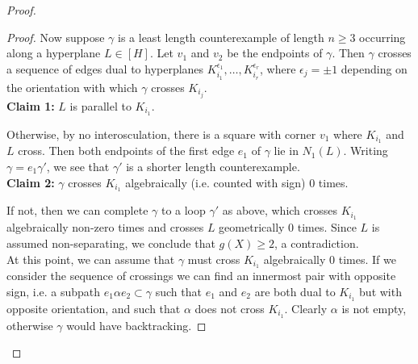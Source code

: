 \documentclass[11pt]{amsart}
\numberwithin{thm}{section}
\theoremstyle{remark}
\theoremstyle{definition}
\newcommand{\overl}[1]{\overline{#1}}
\begin{document}
\begin{proof}
\begin{proof}

Now suppose $\gamma$ is a least length counterexample of length $n\geq 3$ occurring along a hyperplane $L\in [H]$.  Let $v_1$ and $v_2$ be the endpoints of $\gamma$.  Then $\gamma$ crosses a sequence of edges dual to hyperplanes $K_{i_1}^{\epsilon_1},\ldots, K_{i_r}^{\epsilon_r}$, where $\epsilon_j=\pm1$ depending on the orientation with which $\gamma$ crosses $K_{i_j}$. \\

\noindent
\textbf{Claim 1:} $L$ is parallel to $K_{i_1}$. 

\noindent
Otherwise, by no interosculation, there is a square with corner $v_1$ where $K_{i_1}$ and $L$ cross.  Then both endpoints of the first edge $e_1$ of $\gamma$ lie in $N_1(L)$. Writing $\gamma=e_1\gamma'$, we see that $\gamma'$ is a shorter length counterexample.\\

\noindent
\textbf{Claim 2:} $\gamma$ crosses $K_{i_1}$ algebraically (i.e. counted with sign) 0 times. 

\noindent
If not, then we can complete $\gamma$ to a loop $\gamma'$ as above, which crosses $K_{i_1}$ algebraically non-zero times and crosses $L$ geometrically 0 times.  Since $L$ is assumed non-separating, we conclude that $g(X)\geq 2$, a contradiction.\\

At this point, we can assume that $\gamma$ must cross $K_{i_1}$ algebraically 0 times.  If we consider the sequence of crossings we can find an innermost pair with opposite sign, i.e. a subpath $e_1\alpha e_2\subset \gamma$ such that $e_1$ and $e_2$ are both dual to $K_{i_1}$ but with opposite orientation, and such that $\alpha$ does not cross $K_{i_1}$.  Clearly $\alpha$ is not empty, otherwise $\gamma$ would have backtracking.  


\end{proof}
\end{proof}
\end{document}

